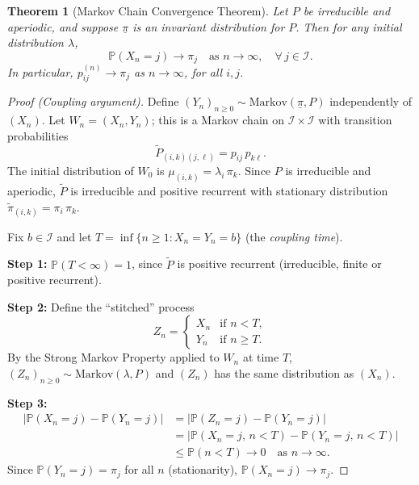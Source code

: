 \documentclass[12pt, a4paper]{article}
\theoremstyle{definition}
\theoremstyle{plain}
\newtheorem{theorem}{Theorem}[section]
\newcommand{\PP}{\mathbb{P}}
\newcommand{\II}{\mathcal{I}}
\begin{document}
\begin{theorem}[Markov Chain Convergence Theorem]
\label{thm:convergence}
Let $P$ be irreducible and aperiodic, and suppose $\underline{\pi}$ is an invariant distribution for $P$. Then for any initial distribution $\lambda$,
\begin{equation*}
  \PP(X_n = j) \to \pi_j \quad \text{as } n \to \infty, \quad \forall\, j \in \II.
\end{equation*}
In particular, $p_{ij}^{(n)} \to \pi_j$ as $n \to \infty$, for all $i, j$.
\end{theorem}

\begin{proof}[Proof (Coupling argument)]
Define $(Y_n)_{n \ge 0} \sim \text{Markov}(\underline{\pi}, P)$ independently of $(X_n)$. Let $W_n = (X_n, Y_n)$; this is a Markov chain on $\II \times \II$ with transition probabilities
\begin{equation*}
  \tilde{P}_{(i,k)(j,\ell)} = p_{ij}\,p_{k\ell}.
\end{equation*}
The initial distribution of $W_0$ is $\mu_{(i,k)} = \lambda_i\,\pi_k$. Since $P$ is irreducible and aperiodic, $\tilde{P}$ is irreducible and positive recurrent with stationary distribution $\tilde{\pi}_{(i,k)} = \pi_i\,\pi_k$.

Fix $b \in \II$ and let $T = \inf\{n \ge 1 : X_n = Y_n = b\}$ (the \emph{coupling time}).

\textbf{Step 1:} $\PP(T < \infty) = 1$, since $\tilde{P}$ is positive recurrent (irreducible, finite or positive recurrent).

\textbf{Step 2:} Define the ``stitched'' process
\begin{equation*}
  Z_n = \begin{cases} X_n & \text{if } n < T, \\ Y_n & \text{if } n \ge T. \end{cases}
\end{equation*}
By the Strong Markov Property applied to $W_n$ at time $T$, $(Z_n)_{n \ge 0} \sim \text{Markov}(\lambda, P)$ and $(Z_n)$ has the same distribution as $(X_n)$.

\textbf{Step 3:} 
\begin{align*}
  |\PP(X_n = j) - \PP(Y_n = j)| &= |\PP(Z_n = j) - \PP(Y_n = j)| \\
  &= |\PP(X_n = j,\, n < T) - \PP(Y_n = j,\, n < T)| \\
  &\le \PP(n < T) \to 0 \quad \text{as } n \to \infty.
\end{align*}
Since $\PP(Y_n = j) = \pi_j$ for all $n$ (stationarity), $\PP(X_n = j) \to \pi_j$.
\end{proof}
\end{document}

